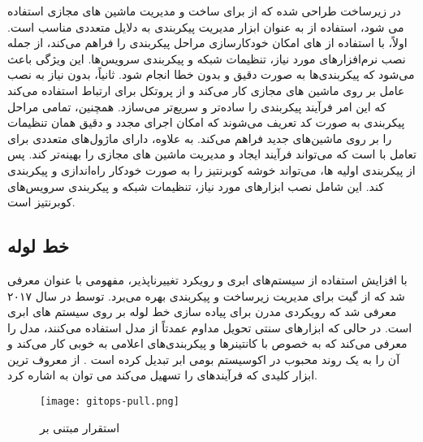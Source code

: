 در زیرساخت طراحی شده که از  برای ساخت و مدیریت ماشین های مجازی استفاده می شود، استفاده از  به عنوان ابزار مدیریت پیکربندی به دلایل متعددی مناسب است. اولاً،  با استفاده از های  امکان خودکارسازی مراحل پیکربندی را فراهم می‌کند، از جمله نصب نرم‌افزارهای مورد نیاز، تنظیمات شبکه و پیکربندی سرویس‌ها. این ویژگی باعث می‌شود که پیکربندی‌ها به صورت دقیق و بدون خطا انجام شود. ثانیاً،  بدون نیاز به نصب عامل  بر روی ماشین های مجازی کار می‌کند و از پروتکل  برای ارتباط استفاده می‌کند که این امر فرآیند پیکربندی را ساده‌تر و سریع‌تر می‌سازد. همچنین، تمامی مراحل پیکربندی به صورت کد تعریف می‌شوند که امکان اجرای مجدد و دقیق همان تنظیمات را بر روی ماشین‌های جدید فراهم می‌کند. به علاوه،  دارای ماژول‌های متعددی برای تعامل با  است که می‌تواند فرآیند ایجاد و مدیریت ماشین های مجازی را بهینه‌تر کند. پس از پیکربندی اولیه ها،  می‌تواند خوشه کوبرنتیز را به صورت خودکار راه‌اندازی و پیکربندی کند. این شامل نصب ابزارهای مورد نیاز، تنظیمات شبکه و پیکربندی سرویس‌های کوبرنتیز است.
\subsection{خط لوله }
با افزایش استفاده از سیستم‌های ابری و رویکرد تغییرناپذیر، مفهومی با عنوان  معرفی شد که از گیت برای مدیریت زیرساخت و پیکربندی بهره می‌برد.  توسط  در سال ۲۰۱۷ معرفی شد که رویکردی مدرن برای پیاده سازی خط لوله  بر روی سیستم های ابری است. در حالی که ابزارهای سنتی تحویل مداوم عمدتاً از مدل  استفاده می‌کنند،  مدل  را معرفی می‌کند که به خصوص با کانتینرها و پیکربندی‌های اعلامی به خوبی کار می‌کند و آن را به یک روند محبوب در اکوسیستم بومی ابر تبدیل کرده است  \cite{Devopsgitops}. از معروف ترین ابزار کلیدی که فرآیندهای  را تسهیل می‌کند می توان به  اشاره کرد. 



\begin{figure}[t]
	\centering
	\texttt{[image: gitops-pull.png]}
	\caption{استقرار مبتنی بر }
	\label{fig: gitops pull}
\end{figure}

